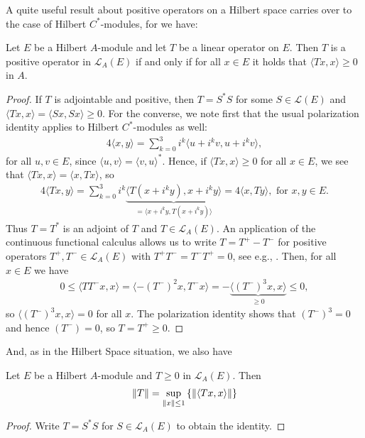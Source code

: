 A quite useful result about positive operators on a Hilbert space carries over to the case of Hilbert $C^*$-modules, for we have:
\begin{lemma}
	Let $E$ be a Hilbert $A$-module and let $T$ be a linear operator on $E$. Then $T$ is a positive operator in $\mathcal{L}_A(E)$ if and only if for all $x \in E$ it holds that $\langle Tx,x \rangle \geq 0$ in $A$.
	\label{mult:Tpos}
\end{lemma}
\begin{proof}
	If $T$ is adjointable and positive, then $T=S^*S$ for some $S \in \mathcal{L}(E)$ and $\langle Tx,x\rangle = \langle Sx,Sx\rangle\geq 0$. For the converse, we note first that the usual polarization identity applies to Hilbert $C^*$-modules as well:
	\begin{align*}
		4\langle x, y\rangle = \sum_{k=0}^3 i^{k} \langle u+i^kv,u+i^kv\rangle,
	\end{align*}
	for all $u,v \in E$, since $ \langle u,v \rangle = \langle v,u\rangle ^*$. Hence, if $\langle Tx , x \rangle \geq 0$ for all $x \in E$, we see that $\langle Tx,x\rangle = \langle x,Tx\rangle$, so
	\begin{align*}
		4 \langle Tx,y\rangle = \sum_{k=0}^3 i^k \underbrace{\langle T(x+i^ky),x+i^ky\rangle}_{=\langle x+i^ky,T(x+i^ky)\rangle} = 4 \langle x,Ty\rangle, \text{ for } x,y \in E.
	\end{align*}
	Thus $T=T^*$ is an adjoint of $T$ and $T \in \mathcal{L}_A(E)$. An application of the continuous functional calculus allows us to write $T=T^+-T^-$ for positive operators $T^+,T^- \in \mathcal{L}_A(E)$ with $T^+T^-=T^-T^+=0$, see e.g., \cite[Theorem 11.2]{zhu}. Then, for all $x \in E$ we have
	\begin{align*}
		0 \leq \langle T T^-x,x \rangle = \langle -(T^-)^2x,T^-x\rangle = -\underbrace{\langle (T^-)^3x,x\rangle}_{\geq 0 } \leq 0,
	\end{align*}
	so $\langle (T^-)^3 x,x \rangle = 0$ for all $x$. The polarization identity shows that $(T^-)^3=0$ and hence $(T^-)=0$, so $T=T^+\geq 0$.
\end{proof}
And, as in the Hilbert Space situation, we also have 
\begin{lemma}
	Let $E$ be a Hilbert $A$-module and $T \geq 0$ in $\mathcal{L}_A(E)$. Then
	\begin{align*}
		\left\lVert T \right\rVert = \sup_{\left\lVert x \right\rVert \leq 1}\left\{ \left\lVert \langle Tx,x\rangle \right\rVert \right\}
	\end{align*}
	\label{mult:normposT}
\end{lemma}
\begin{proof}
	Write $T=S^*S$ for $S \in \mathcal{L}_A(E)$ to obtain the identity.
\end{proof}


